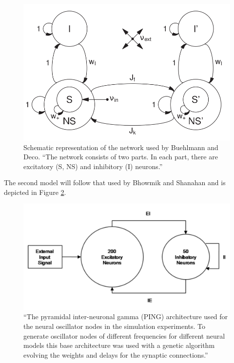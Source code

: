 \documentclass[a4paper,11pt]{article}
\begin{document}
\begin{figure}[H]
\centering
\includegraphics[scale = 0.75]{Buehlmann2010_Schema}
\caption{Schematic representation of the network used by Buehlmann and Deco. ``The network consists of two parts. In each part, there are excitatory (S, NS) and inhibitory (I) neurons.'' \cite{Buehlmann2010}}
\label{Buehlmann2010_Schema}
\end{figure}

The second model will follow that used by Bhowmik and Shanahan and is depicted in Figure \ref{Bhowmik2013_Schema}.

\begin{figure}[H]
\centering
\includegraphics[scale = 0.75]{Bhowmik2013_Schema}
\caption{``The pyramidal inter-neuronal gamma (PING) architecture used for the neural oscillator nodes in the simulation experiments. To generate oscillator nodes of different frequencies for different neural models this base architecture was used with a genetic algorithm evolving the weights and delays for the synaptic connections.'' \cite{Bhowmik2013}}
\label{Bhowmik2013_Schema}
\end{figure}
\end{document}
